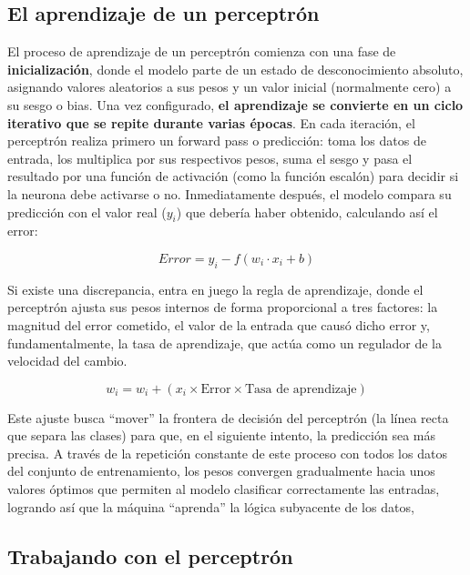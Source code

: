 \documentclass[a4paper,11pt]{article}
\renewenvironment{equation}{\begin{equation*}}{\end{equation*}}
\let\oldequation\equation
\let\endoldequation\endequation
\renewenvironment{equation}
  {\vspace{0.5em}\oldequation}
  {\endoldequation\vspace{0.5em}}
\begin{document}
\subsection{El aprendizaje de un perceptrón}

El proceso de aprendizaje de un perceptrón comienza con una fase de
\textbf{inicialización}, donde el modelo parte de un estado de
desconocimiento absoluto, asignando valores aleatorios a sus pesos y un
valor inicial (normalmente cero) a su sesgo o bias. Una vez configurado,
\textbf{el aprendizaje se convierte en un ciclo iterativo que se repite
durante varias épocas}. En cada iteración, el perceptrón realiza primero
un forward pass o predicción: toma los datos de entrada, los multiplica
por sus respectivos pesos, suma el sesgo y pasa el resultado por una
función de activación (como la función escalón) para decidir si la
neurona debe activarse o no. Inmediatamente después, el modelo compara
su predicción con el valor real (\(y_i\)) que debería haber obtenido,
calculando así el error:

\begin{equation}
    Error = y_i - f(w_i \cdot x_i + b)
\end{equation}

Si existe una discrepancia, entra en juego la regla de aprendizaje,
donde el perceptrón ajusta sus pesos internos de forma proporcional a
tres factores: la magnitud del error cometido, el valor de la entrada
que causó dicho error y, fundamentalmente, la tasa de aprendizaje, que
actúa como un regulador de la velocidad del cambio.

\begin{equation}
    w_i = w_i + (x_i \times \text{Error} \times \text{Tasa de aprendizaje})
\end{equation}

Este ajuste busca ``mover'' la frontera de decisión del perceptrón (la
línea recta que separa las clases) para que, en el siguiente intento, la
predicción sea más precisa. A través de la repetición constante de este
proceso con todos los datos del conjunto de entrenamiento, los pesos
convergen gradualmente hacia unos valores óptimos que permiten al modelo
clasificar correctamente las entradas, logrando así que la máquina
``aprenda'' la lógica subyacente de los datos,


\subsection{Trabajando con el perceptrón}
\end{document}
